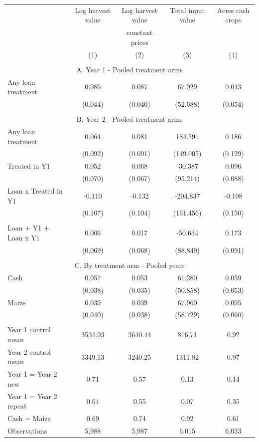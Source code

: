 \begin{tabular}{l cc cc}
\hline
 & Log harvest value & Log harvest value & Total input value & Acres cash crops \\ 
 & & constant prices & &  \\ 
 & (1) & (2) & (3) & (4) \\ 
\hline
 \\ 
\multicolumn{5}{c}{A. Year 1 - Pooled treatment arms} \\ 
Any loan treatment & 0.086 & 0.087 & 67.929 & 0.043 \\
 & (0.044) & (0.040) & (52.688) & (0.054) \\
 \\ 
\multicolumn{5}{c}{B. Year 2 - Pooled treatment arms} \\ 
Any loan treatment & 0.064 & 0.081 & 184.591 & 0.186 \\
 & (0.092) & (0.091) & (149.005) & (0.129) \\
Treated in Y1 & 0.052 & 0.068 & -30.387 & 0.096 \\
 & (0.070) & (0.067) & (95.214) & (0.088) \\
Loan x Treated in Y1 & -0.110 & -0.132 & -204.837 & -0.108 \\
 & (0.107) & (0.104) & (161.456) & (0.150) \\
 \\ 
Loan + Y1 + Loan x Y1 & 0.006 & 0.017 & -50.634 & 0.173 \\
 & (0.069) & (0.068) & (88.849) & (0.091) \\
 \\ 
\multicolumn{5}{c}{C. By treatment arm - Pooled years} \\ 
Cash & 0.057 & 0.053 & 61.280 & 0.059 \\
 & (0.038) & (0.035) & (50.858) & (0.053) \\
Maize & 0.039 & 0.039 & 67.960 & 0.095 \\
 & (0.040) & (0.038) & (58.729) & (0.060) \\
 \\ 
\hline
Year 1 control mean & 3534.93 & 3640.44 & 816.71 & 0.92 \\
Year 2 control mean & 3349.13 & 3240.25 & 1311.82 & 0.97 \\
Year 1 = Year 2 new & 0.71 & 0.57 & 0.13 & 0.14 \\
Year 1 = Year 2 repeat & 0.64 & 0.55 & 0.07 & 0.35 \\
Cash = Maize & 0.69 & 0.74 & 0.92 & 0.61 \\
Observations &     5,988 &     5,987 &     6,015 &     6,033 \\
\hline
\end{tabular}
